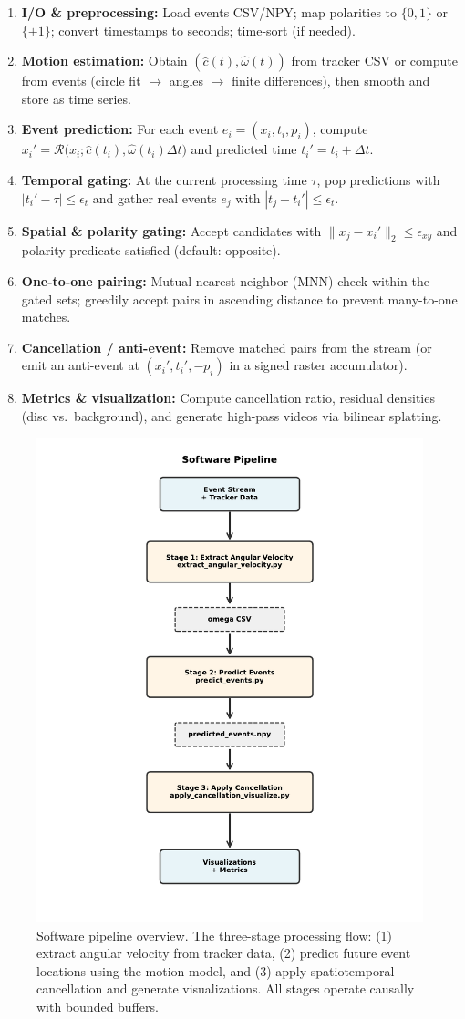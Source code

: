 \begin{enumerate}
  \item \textbf{I/O \& preprocessing:} Load events CSV/NPY; map polarities to $\{0,1\}$ or $\{\pm 1\}$; convert timestamps to seconds; time-sort (if needed).
  \item \textbf{Motion estimation:} Obtain $(\hat c(t),\hat\omega(t))$ from tracker CSV or compute from events (circle fit $\rightarrow$ angles $\rightarrow$ finite differences), then smooth and store as time series.
  \item \textbf{Event prediction:} For each event $e_i=(x_i,t_i,p_i)$, compute $x_i' = \mathcal{R}\!\big(x_i; \hat c(t_i), \hat\omega(t_i)\Delta t\big)$ and predicted time $t_i' = t_i+\Delta t$.
  \item \textbf{Temporal gating:} At the current processing time $\tau$, pop predictions with $|t_i' - \tau| \le \epsilon_t$ and gather real events $e_j$ with $|t_j - t_i'| \le \epsilon_t$.
  \item \textbf{Spatial \& polarity gating:} Accept candidates with $\|x_j - x_i'\|_2 \le \epsilon_{xy}$ and polarity predicate satisfied (default: opposite).
  \item \textbf{One-to-one pairing:} Mutual-nearest-neighbor (MNN) check within the gated sets; greedily accept pairs in ascending distance to prevent many-to-one matches.
  \item \textbf{Cancellation / anti-event:} Remove matched pairs from the stream (or emit an anti-event at $(x_i',t_i',-p_i)$ in a signed raster accumulator).
  \item \textbf{Metrics \& visualization:} Compute cancellation ratio, residual densities (disc vs.\ background), and generate high-pass videos via bilinear splatting.
\end{enumerate}

\begin{figure}[t]
  \centering
  \includegraphics[width=0.55\linewidth]{figures/pipeline_flowchart.pdf}
  \caption{Software pipeline overview. The three-stage processing flow: (1) extract angular velocity from tracker data, (2) predict future event locations using the motion model, and (3) apply spatiotemporal cancellation and generate visualizations. All stages operate causally with bounded buffers.}
  \label{fig:pipeline}
\end{figure}

